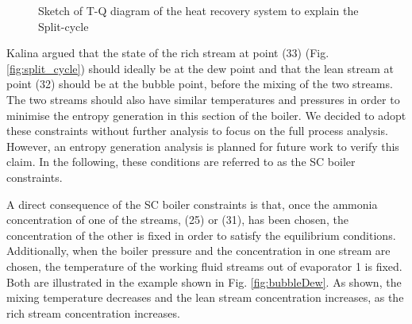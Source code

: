 \documentclass[review,3p]{elsarticle}
\begin{document}
\begin{figure*}[htpb]
\centering
{}

\caption{Sketch of T-Q diagram of the heat recovery system to explain the Split-cycle}
\label{fig:theory}
\end{figure*}






Kalina argued \cite{Kalina1986a} that the state of the rich stream at point (33) (Fig. \ref{fig:split_cycle}) should ideally be at the dew point and that the lean stream at point (32) should be at the bubble point, before the mixing of the two streams. The two streams should also have similar temperatures and pressures in order to minimise the entropy generation in this section of the boiler. We decided to adopt these constraints without further analysis to focus on the full process analysis. However, an entropy generation analysis is planned for future work to verify this claim. In the following, these conditions are referred to as the SC boiler constraints. 

A direct consequence of the SC boiler constraints is that, once the ammonia concentration of one of the streams, (25) or (31), has been chosen, the concentration of the other is fixed in order to satisfy the equilibrium conditions. Additionally, when the boiler pressure and the concentration in one stream are chosen, the temperature of the working fluid streams out of evaporator 1 is fixed. Both are illustrated in the example shown in Fig. \ref{fig:bubbleDew}. As shown, the mixing temperature decreases and the lean stream concentration increases, as the rich stream concentration increases. 
\end{document}
